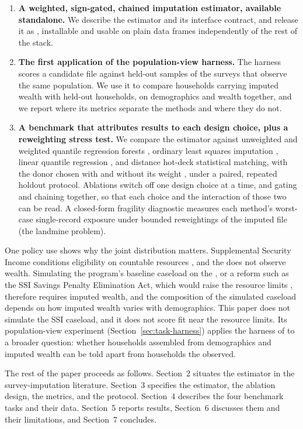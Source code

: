 \begin{enumerate}
\item \textbf{A weighted, sign-gated, chained imputation estimator, available
standalone.} We describe the estimator and its interface contract, and
release it as \populacefit{}, installable and usable on plain data frames
independently of the rest of the \populace{} stack.
\item \textbf{The first application of the population-view harness.} The
harness \citep{ghenis2026popdgp} scores a candidate file against held-out
samples of the surveys that observe the same population. We use it to
compare \cps{} households carrying imputed wealth with held-out \scf{}
households, on demographics and wealth together, and we report where its
metrics separate the methods and where they do not.
\item \textbf{A benchmark that attributes results to each design choice, plus
a reweighting stress test.} We compare the estimator against unweighted and
weighted quantile regression forests \citep{meinshausen2006quantile},
ordinary least squares imputation \citep{vonhippel2013should}, linear
quantile regression \citep{koenker1978regression}, and distance
hot-deck statistical matching, with the donor chosen with and without its
weight \citep{andridge2010review, dorazio2006statistical}, under a paired,
repeated holdout protocol. Ablations switch off one design choice at a time,
and gating and chaining together, so that each choice and the interaction of
those two can be read. A closed-form fragility diagnostic
measures each method's worst-case single-record exposure under bounded
reweightings of the imputed file (the landmine problem).
\end{enumerate}

One policy use shows why the joint distribution matters. Supplemental
Security Income conditions eligibility on countable resources
\citep{ssa2024ssi}, and the \cps{} does not observe wealth. Simulating the
program's baseline caseload on the \cps{}, or a reform such as the SSI
Savings Penalty Elimination Act, which would raise the resource limits
\citep{ssi_spea_2025}, therefore requires imputed wealth, and the
composition of the simulated caseload depends on how imputed wealth varies
with demographics. This paper does not simulate the SSI caseload, and it
does not score fit near the resource limits. Its population-view experiment
(Section~\ref{sec:task-harness}) applies the harness of
\citet{ghenis2026popdgp} to a broader question: whether households assembled
from \cps{} demographics and imputed wealth can be told apart from households
the \scf{} observed.

The rest of the paper proceeds as follows. Section~2 situates the estimator in
the survey-imputation literature. Section~3 specifies the estimator, the
ablation design, the metrics, and the protocol. Section~4 describes the four
benchmark tasks and their data. Section~5 reports results, Section~6
discusses them and their limitations, and Section~7 concludes.
